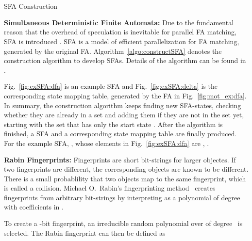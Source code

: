 \documentclass[10pt, conference, compsocconf]{IEEEtran}
\begin{document}
\begin{algorithm}[ht]
    \\
    \\
    
    \caption{SFA Construction}
    \label{algo:constructSFA}
\end{algorithm}

{\bf Simultaneous Deterministic Finite Automata:}
Due to the fundamental reason that the overhead of speculation is
inevitable for parallel FA matching, SFA is introduced
\cite{Sinya2013}. SFA is a model of efficient parallelization for FA
matching, generated by the original FA. Algorithm~\ref{algo:constructSFA} denotes the
construction algorithm to develop SFAs. Details of the algorithm can be found in \cite{Sinya2013}.

Fig.~\ref{fig:exSFA:dfa} is an example SFA and
Fig.~\ref{fig:exSFA:delta} is the corresponding state mapping table,
generated by the FA in Fig.~\ref{fig:mot_ex:dfa}.
In summary, the construction algorithm keeps finding new SFA-states, checking
whether they are already in a set and adding them if they are not in
the set yet, starting with the set that has only the start state .
After the algorithm is finished, a SFA and a corresponding state mapping
table are finally
produced. For the example SFA, , whose elements in
Fig.~\ref{fig:exSFA:dfa} are , .


{\bf Rabin Fingerprints:}
Fingerprints are short bit-strings for larger objectes. If two
fingerprints are different, the corresponding objects are known
to be different. There is a small probablility that two
objects map to the same fingerprint, which is called a collision.
Michael O.~Rabin's fingerprinting method~\cite{Rabin81,Broder93}
creates fingerprints from arbitrary
bit-strings
 by interpreting  as
a polynomial  of degree  with coefficients
in . 


To create a -bit fingerprint, an irreducible random polynomial
 over  of degree~ is selected.
The Rabin fingerprint can then be defined as 
\end{document}
